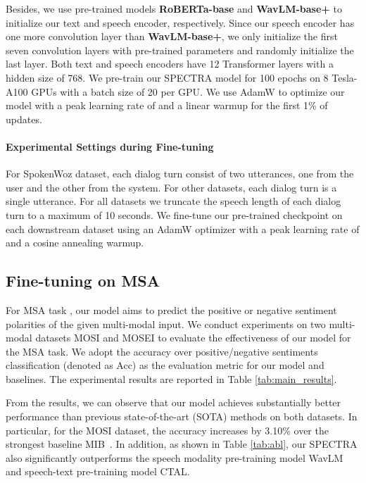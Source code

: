 \documentclass[11pt]{article}
\begin{document}
Besides, we use pre-trained models \textbf{RoBERTa-base} and \textbf{WavLM-base+} to initialize our text and speech encoder, respectively.
Since our speech encoder has one more convolution layer than \textbf{WavLM-base+}, we only initialize the first seven convolution layers with pre-trained parameters and randomly initialize the last layer. Both text and speech encoders have 12 Transformer layers with a hidden size  of 768. 
We pre-train our SPECTRA model for 100 epochs on 8 Tesla-A100 GPUs with a batch size of 20 per GPU. We use AdamW \citep{loshchilov2018fixing} to optimize our model with a peak learning rate of  and a linear warmup for the first 1\% of updates. 

\paragraph{Experimental Settings during Fine-tuning}
For SpokenWoz dataset, each dialog turn consist of two utterances, one from the user and the other from the system. For other datasets, each dialog turn is a single utterance. 
For all datasets we truncate the speech length of each dialog turn to a maximum of 10 seconds.
We fine-tune our pre-trained checkpoint on each downstream dataset using an AdamW \citep{loshchilov2018fixing} optimizer with a peak learning rate of  and a cosine annealing warmup. 


\subsection{Fine-tuning on MSA}
\label{sec:msa}
For MSA task \cite{hu2022unimse}, our model aims to predict the positive or negative sentiment polarities of the given multi-modal input.
We conduct experiments on two multi-modal datasets MOSI \citep{mosi} and MOSEI \citep{mosei} to evaluate the effectiveness of our model for the MSA task. 
We adopt the accuracy over positive/negative sentiments classification (denoted as Acc) as the evaluation metric for our model and baselines. The experimental results are reported in Table \ref{tab:main_results}.


From the results, we can observe that our model achieves substantially better performance than previous state-of-the-art (SOTA) methods on both datasets.
In particular, for the MOSI dataset, the accuracy increases by 3.10\% over the strongest baseline MIB~\citep{mai2022multimodal}.
In addition, as shown in Table \ref{tab:abl}, our SPECTRA also significantly outperforms the speech modality pre-training model WavLM and speech-text pre-training model CTAL.  
\end{document}
